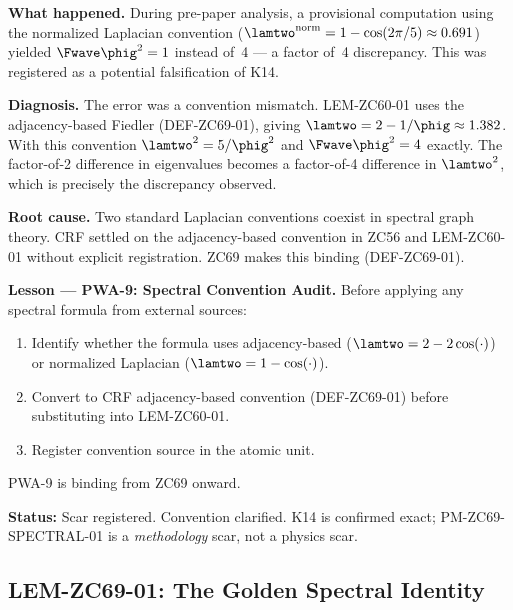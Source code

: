 \documentclass[12pt, a4paper]{article}
\begin{document}
\begin{derivedbox}[title={PM-ZC69-SPECTRAL-01: Normalized vs Adjacency
  Laplacian Convention --- Scar (Failure Stance)}]

\textbf{What happened.}
During pre-paper analysis, a provisional computation
using the normalized Laplacian convention
($\lamtwo^{\rm norm} = 1 - \cos(2\pi/5) \approx 0.691$)
yielded $\Fwave\phig^2 = 1$ instead of~4 ---
a factor of~4 discrepancy.
This was registered as a potential falsification of K14.

\textbf{Diagnosis.}
The error was a convention mismatch.
LEM-ZC60-01 uses the adjacency-based Fiedler
(DEF-ZC69-01), giving $\lamtwo = 2 - 1/\phig \approx 1.382$.
With this convention $\lamtwo^2 = 5/\phig^2$ and
$\Fwave\phig^2 = 4$ exactly.
The factor-of-2 difference in eigenvalues becomes
a factor-of-4 difference in $\lamtwo^2$, which is
precisely the discrepancy observed.

\textbf{Root cause.}
Two standard Laplacian conventions coexist in spectral
graph theory. CRF settled on the adjacency-based
convention in ZC56 and LEM-ZC60-01 without explicit
registration. ZC69 makes this binding (DEF-ZC69-01).

\textbf{Lesson --- PWA-9: Spectral Convention Audit.}
Before applying any spectral formula from external sources:
\begin{enumerate}[leftmargin=2em, noitemsep]
  \item Identify whether the formula uses
    adjacency-based ($\lamtwo = 2 - 2\cos(\cdot)$)
    or normalized Laplacian ($\lamtwo = 1 - \cos(\cdot)$).
  \item Convert to CRF adjacency-based convention
    (DEF-ZC69-01) before substituting into LEM-ZC60-01.
  \item Register convention source in the atomic unit.
\end{enumerate}

PWA-9 is binding from ZC69 onward.

\textbf{Status:} Scar registered. Convention clarified.
K14 is confirmed exact; PM-ZC69-SPECTRAL-01 is a
\emph{methodology} scar, not a physics scar.
\end{derivedbox}

\subsection{LEM-ZC69-01: The Golden Spectral Identity}
\label{sec:lem01}
\end{document}
